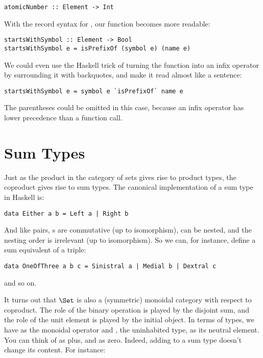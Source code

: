 \begin{Verbatim}
atomicNumber :: Element -> Int
\end{Verbatim}
With the record syntax for , our function
 becomes more readable:

\begin{Verbatim}
startsWithSymbol :: Element -> Bool
startsWithSymbol e = isPrefixOf (symbol e) (name e)
\end{Verbatim}
We could even use the Haskell trick of turning the function
 into an infix operator by surrounding it with
backquotes, and make it read almost like a sentence:

\begin{Verbatim}
startsWithSymbol e = symbol e `isPrefixOf` name e
\end{Verbatim}
The parentheses could be omitted in this case, because an infix operator
has lower precedence than a function call.

\section{Sum Types}

Just as the product in the category of sets gives rise to product types,
the coproduct gives rise to sum types. The canonical implementation of a
sum type in Haskell is:

\begin{Verbatim}
data Either a b = Left a | Right b
\end{Verbatim}
And like pairs, s are commutative (up to isomorphism),
can be nested, and the nesting order is irrelevant (up to isomorphism).
So we can, for instance, define a sum equivalent of a triple:

\begin{Verbatim}
data OneOfThree a b c = Sinistral a | Medial b | Dextral c
\end{Verbatim}
and so on.

It turns out that $\Set$ is also a (symmetric) monoidal category
with respect to coproduct. The role of the binary operation is played by
the disjoint sum, and the role of the unit element is played by the
initial object. In terms of types, we have  as the
monoidal operator and , the uninhabited type, as its
neutral element. You can think of  as plus, and
 as zero. Indeed, adding  to a sum type
doesn't change its content. For instance:

